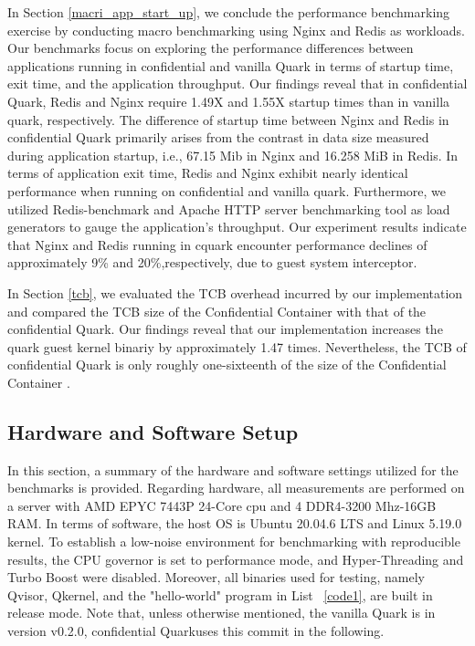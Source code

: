In Section \ref{macri_app_start_up}, we conclude the performance benchmarking exercise by conducting macro benchmarking using Nginx \cite*{nginx} and Redis \cite*{redis} as workloads. Our benchmarks focus on exploring the performance differences between applications running in confidential and vanilla Quark 
in terms of startup time, exit time, and the application throughput. Our findings reveal that in confidential Quark, Redis \cite*{redis} and Nginx \cite*{nginx} require 1.49X and 1.55X startup times than in vanilla quark, respectively. The difference of startup time between Nginx and Redis in 
confidential Quark primarily arises from the contrast in data size measured during application startup, i.e., 67.15 Mib in Nginx and 16.258 MiB in Redis. In terms of application exit time, Redis and Nginx exhibit nearly identical performance when running on confidential  and vanilla quark. 
Furthermore, we utilized Redis-benchmark \cite*{Redis_benchmark} and Apache HTTP server benchmarking tool \cite*{ab} as load generators to gauge the application's throughput. Our experiment results indicate that Nginx and Redis running in cquark encounter performance declines of approximately 
9\% and 20\%,respectively, due to guest system interceptor.

In Section \ref{tcb}, we evaluated the TCB overhead incurred by our implementation and compared the TCB size of the Confidential Container \cite*{confidential_kata} with that of the confidential Quark. Our findings reveal that our implementation increases the quark guest kernel binariy by approximately 1.47 times. Nevertheless, 
the TCB of confidential Quark is only roughly one-sixteenth of the size of the  Confidential Container \cite*{confidential_kata}.

\subsection{Hardware and Software Setup}\label{Hardware_and_Software_Setup}

In this section, a summary of the hardware and software settings utilized for the benchmarks is provided. Regarding hardware, all measurements are performed on a server with AMD EPYC 7443P 24-Core cpu and 4 DDR4-3200 Mhz-16GB RAM. In terms of software, the host OS is Ubuntu 20.04.6 LTS and Linux 
5.19.0 kernel. To establish a low-noise environment for benchmarking with reproducible results, the CPU governor is set to performance mode, and Hyper-Threading and Turbo Boost were disabled.  Moreover, all binaries used for testing, namely Qvisor, Qkernel, and the "hello-world" program in List ~\ref{code1}, 
are built in release mode. Note that, unless otherwise mentioned, the vanilla Quark is in version v0.2.0, confidential Quarkuses this commit  \cite*{qualitativ_confidentail_quark} in the following.


